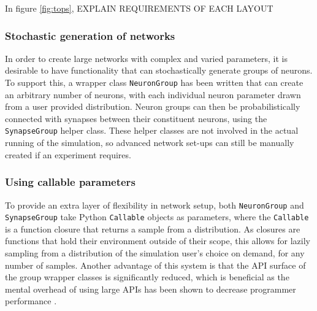 In figure \ref{fig:tops}, EXPLAIN REQUIREMENTS OF EACH LAYOUT

\subsubsection{Stochastic generation of networks}

In order to create large networks with complex and varied parameters, it is
desirable to have functionality that can stochastically generate groups of
neurons. To support this, a wrapper class \texttt{NeuronGroup} has been written
that can create an arbitrary number of neurons, with each individual neuron
parameter drawn from a user provided distribution. Neuron groups can then be
probabilistically connected with synapses between their constituent neurons,
using the \texttt{SynapseGroup} helper class. These helper classes are not
involved in the actual running of the simulation, so advanced network set-ups
can still be manually created if an experiment requires.

\subsubsection{Using callable parameters}

To provide an extra layer of flexibility in network setup, both
\texttt{NeuronGroup} and \texttt{SynapseGroup} take Python \texttt{Callable}
objects as parameters, where the \texttt{Callable} is a function closure that
returns a sample from a distribution. As closures are functions that hold their
environment outside of their scope, this allows for lazily sampling from a distribution of the simulation user's choice on demand, for any
number of samples. Another advantage of this system is that the API surface of
the group wrapper classes is significantly reduced, which is beneficial as the
mental overhead of using large APIs has been shown to decrease programmer
performance \autocite{ellis_factory_2007,omar_active_2012}.